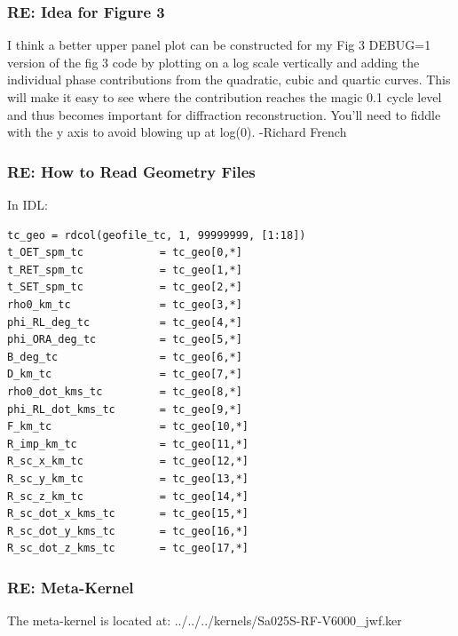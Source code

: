\documentclass[crop=false,class=book]{standalone}
\begin{document}
\subsubsection{\footnotesize RE: Idea for Figure 3}
I think a better upper panel plot can be constructed for my Fig 3 DEBUG=1 version of the fig 3 code by plotting on a log scale vertically and adding the individual phase contributions from the quadratic, cubic and quartic curves. This will make it easy to see where the contribution reaches the magic 0.1 cycle level and thus becomes important for diffraction reconstruction. You'll need to fiddle with the y axis to avoid blowing up at log(0). -Richard French
\subsubsection{\footnotesize RE: How to Read Geometry Files}
In IDL:
\begin{lstlisting}[language=IDL]
tc_geo = rdcol(geofile_tc, 1, 99999999, [1:18])
t_OET_spm_tc            = tc_geo[0,*]
t_RET_spm_tc            = tc_geo[1,*]
t_SET_spm_tc            = tc_geo[2,*]
rho0_km_tc              = tc_geo[3,*]
phi_RL_deg_tc           = tc_geo[4,*]
phi_ORA_deg_tc          = tc_geo[5,*]
B_deg_tc                = tc_geo[6,*]
D_km_tc                 = tc_geo[7,*]
rho0_dot_kms_tc         = tc_geo[8,*]
phi_RL_dot_kms_tc       = tc_geo[9,*]
F_km_tc                 = tc_geo[10,*]
R_imp_km_tc             = tc_geo[11,*]
R_sc_x_km_tc            = tc_geo[12,*]
R_sc_y_km_tc            = tc_geo[13,*]
R_sc_z_km_tc            = tc_geo[14,*]
R_sc_dot_x_kms_tc       = tc_geo[15,*]
R_sc_dot_y_kms_tc       = tc_geo[16,*]
R_sc_dot_z_kms_tc       = tc_geo[17,*]
\end{lstlisting}
\subsubsection{\footnotesize RE: Meta-Kernel}
The meta-kernel is located at: ../../../kernels/Sa025S-RF-V6000\_jwf.ker
\end{document}
